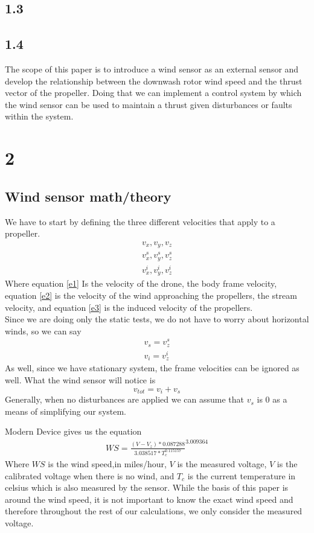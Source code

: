 \documentclass[twocolumn]{article}
\begin{document}
	\subsection{1.3}
	\subsection{1.4}
	The scope of this paper is to introduce a wind sensor as an external sensor and develop the relationship between the downwash rotor wind speed and the thrust vector of the propeller. Doing that we can implement a control system by which the wind sensor can be used to maintain a thrust given disturbances or faults within the system. 
	\section{2}
	\subsection{Wind sensor math/theory}
	We have to start by defining the three different velocities that apply to a propeller.\\
	\begin{eqnarray}
	\label{e1}
	v_x , v_y , v_z \\
	\label{e2}
	v^s_{x} , v^s_{y} , v^s_{z} \\
	\label{e3}
	v^i_{x} , v^i_{y} , v^i_{z}
	\end{eqnarray}
	Where equation \ref{e1} Is the velocity of the drone, the body frame velocity, equation \ref{e2} is the velocity of the wind approaching the propellers, the stream velocity, and equation \ref{e3} is the induced velocity of the propellers.\\
	Since we are doing only the static tests, we do not have to worry about horizontal winds, so we can say 
	\begin{eqnarray}
	\nonumber
	v_s = v^s_{z}\\
	\nonumber
	v_i = v^i_{z}
	\end{eqnarray}
	As well, since we have stationary system, the frame velocities can be ignored as well. What the wind sensor will notice is 
	\begin{equation}
	v_{tot} = v_{i} + v_{s}
	\label{vtot}
	\end{equation}	
	Generally, when no disturbances are applied we can assume that $v_s$ is $0$ as a means of simplifying our system.
	
	Modern Device \cite{md} gives us the equation 
	\begin{eqnarray}
		WS = \frac{(V - V_{z})*0.087288}{3.038517 * T_{c} ^{0.115157}} ^ {3.009364}
		\label{wind_speed}
	\end{eqnarray}
	Where $WS$ is the wind speed,in miles/hour, $V$ is the measured voltage, $V$ is the calibrated voltage when there is no wind, and $T_c$ is the current temperature in celsius which is also measured by the sensor. While the basis of this paper is around the wind speed, it is not important to know the exact wind speed and therefore throughout the rest of our calculations, we only consider the measured voltage. 
	
\end{document}
